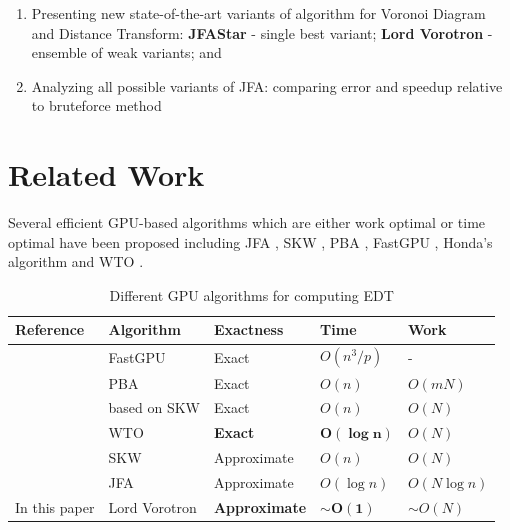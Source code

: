 \documentclass{article}
\newcommand{\citep}[1]{\citeauthor*{#1} \cite{#1}} %
\newcommand{\ourjfasingle}{JFAStar}
\newcommand{\ourjfa}{Lord Vorotron} %
\begin{document}
\begin{enumerate}
	\item Presenting new state-of-the-art variants of algorithm for Voronoi
		Diagram and Distance Transform: \newline
		\textbf{\ourjfasingle} - single best variant;
		\textbf{\ourjfa} - ensemble of weak variants; and
	\item Analyzing all possible variants of JFA: comparing error and speedup
		relative to bruteforce method
\end{enumerate}

\section{Related Work} %

Several efficient GPU-based algorithms which are either
work optimal or time optimal have been proposed including
JFA \cite{rong2006jump}, SKW \cite{schneider2009gpu},
PBA \cite{cao2010parallel}, FastGPU \cite{de2017fast}, Honda's algorithm \cite{honda2017simple} and
WTO \cite{manduhu2019work}.

\begin{table}[H] \centering
\begin{tabular}{@{}lllll@{}}
\toprule
Reference                & Algorithm    & Exactness   & Time         & Work         \\ \midrule
\citep{de2017fast}       & FastGPU      & Exact       & $O(n^3/p)$   & -            \\
\citep{cao2010parallel}  & PBA          & Exact       & $O(n)$       & $O(mN)$      \\
\citep{honda2017simple}  & based on SKW & Exact       & $O(n)$       & $O(N)$       \\
\citep{manduhu2019work}  & WTO          & \cellcolor{blue!25}\textbf{Exact}& \cellcolor{blue!25}$\bm{O(\log n)}$  & $O(N)$       \\
\citep{schneider2009gpu} & SKW          & Approximate & $O(n)$       & $O(N)$       \\
\citep{rong2006jump}     & JFA          & Approximate & $O(\log n)$  & $O(N\log n)$ \\ \bottomrule
In this paper            & \ourjfa      & \cellcolor{blue!25}\textbf{Approximate} & \cellcolor{blue!25}$\sim$$\bm{O(1)}$ & $\sim$$O(N)$ \\ \bottomrule
\end{tabular}
\vspace{1em}
\caption{Different GPU algorithms for computing EDT}
\end{table}
\end{document}

